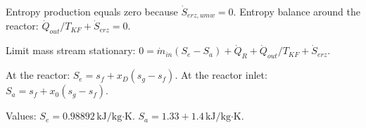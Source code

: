 Entropy production equals zero because \( \dot{S}_{erz,umw} = 0 \).  
Entropy balance around the reactor:  
\( \dot{Q}_{out} / T_{KF} + \dot{S}_{erz} = 0 \).  

Limit mass stream stationary:  
\( 0 = \dot{m}_{in} (S_e - S_a) + \dot{Q}_R + \dot{Q}_{out} / T_{KF} + \dot{S}_{erz} \).  

At the reactor:  
\( S_e = s_f + x_D (s_g - s_f) \).  
At the reactor inlet:  
\( S_a = s_f + x_0 (s_g - s_f) \).  

Values:  
\( S_e = 0.98892 \, \text{kJ/kg·K} \).  
\( S_a = 1.33 + 1.4 \, \text{kJ/kg·K} \).